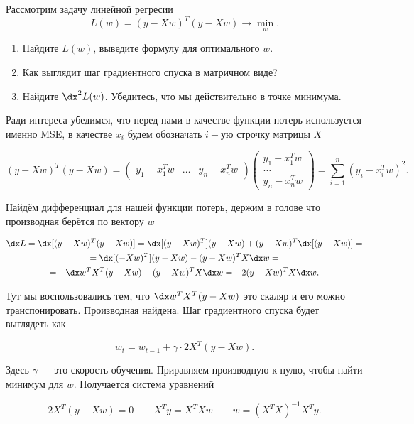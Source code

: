 \begin{problem}{}
	Рассмотрим задачу линейной регресии
	\[
	L(w) = (y - Xw)^T(y - Xw) \to \min_{w}.
	\]
	
	\begin{enumerate}
		\item Найдите $L(w)$, выведите формулу для оптимального $w$.
		\item Как выглядит шаг градиентного спуска в матричном виде?
		\item Найдите $\dx^2L(w)$. Убедитесь, что мы действительно в точке минимума. 
	\end{enumerate}
\end{problem}
\begin{sol} 
Ради интереса убедимся, что перед нами в качестве функции потерь используется именно MSE, в качестве $x_i$ будем обозначать $i-$ую строчку матрицы $X$

\[
(y - Xw)^T(y - Xw) = \begin{pmatrix} y_1 - x_1^Tw &  \ldots & y_n - x_n^Tw \end{pmatrix} \begin{pmatrix} y_1 - x_1^Tw \\  \ldots \\ y_n - x_n^Tw \end{pmatrix}   = \sum_{i=1}^n (y_i - x_i^Tw)^2.
\]

Найдём дифференциал для нашей функции потерь, держим в голове что производная берётся по вектору $w$ 

\begin{multline*}
\dx L = \dx[(y - Xw)^T(y - Xw)] = \dx[(y - Xw)^T] (y - Xw) + (y - Xw)^T\dx[(y - Xw)] = \\ = \dx[(-Xw)^T] (y - Xw) - (y - Xw)^TX\dx w = \\ = - \dx w^T X^T (y - Xw) - (y - Xw)^TX\dx w = -2 (y - Xw)^TX \dx w.
\end{multline*} 

Тут мы воспользовались тем, что $ \dx w^T X^T (y - Xw)$ это скаляр и его можно транспонировать. Производная найдена. Шаг градиентного спуска будет выглядеть как 

\[
w_t = w_{t-1} + \gamma \cdot 2X^T(y-Xw).
\]

Здесь $\gamma$ --- это скорость обучения. Приравняем производную к нулю, чтобы найти минимум для $w$. Получается система уравнений

\[
2X^T(y-Xw) = 0 \qquad  X^Ty = X^TX w \qquad w = (X^TX)^{-1} X^Ty.
\]


\end{sol}
